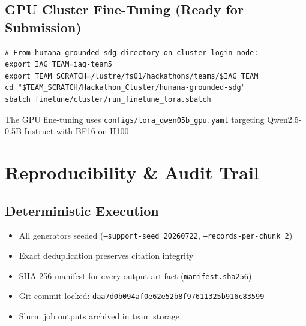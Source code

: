 \documentclass[11pt,a4paper]{article}
\begin{document}
\begin{figure}[H]
\centering
{}
\end{figure}

\subsection{GPU Cluster Fine-Tuning (Ready for Submission)}
\begin{lstlisting}[style=nvidia, caption={Slurm Submission for Qwen2.5-0.5B LoRA SFT}]
# From humana-grounded-sdg directory on cluster login node:
export IAG_TEAM=iag-team5
export TEAM_SCRATCH=/lustre/fs01/hackathons/teams/$IAG_TEAM
cd "$TEAM_SCRATCH/Hackathon_Cluster/humana-grounded-sdg"
sbatch finetune/cluster/run_finetune_lora.sbatch
\end{lstlisting}

The GPU fine-tuning uses \texttt{configs/lora\_qwen05b\_gpu.yaml} targeting Qwen2.5-0.5B-Instruct with BF16 on H100.

\section{Reproducibility \& Audit Trail}
\label{sec:reproducibility}

\subsection{Deterministic Execution}
\begin{itemize}[label=\textcolor{nvidiaGreen}{$\bullet$}, leftmargin=*]
    \item All generators seeded (\texttt{--support-seed 20260722}, \texttt{--records-per-chunk 2})
    \item Exact deduplication preserves citation integrity
    \item SHA-256 manifest for every output artifact (\texttt{manifest.sha256})
    \item Git commit locked: \texttt{daa7d0b094af0e62e52b8f97611325b916c83599}
    \item Slurm job outputs archived in team storage
\end{itemize}
\end{document}
